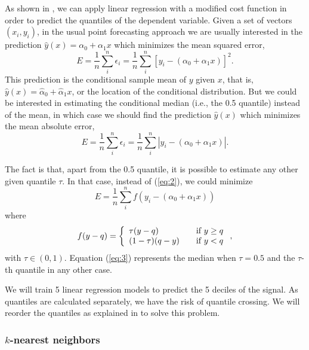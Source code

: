 \documentclass[a4paper,twocolumn,5p]{elsarticle}
\begin{document}
As shown in \cite{koenker_quantile_2001}, we can apply linear
regression with a modified cost function in order to predict the
quantiles of the dependent variable.  Given a set of vectors
$(x_i, y_i)$, in the usual point forecasting approach we are usually
interested in the prediction $\hat y(x) = \alpha_0 + \alpha_1 x$ which
minimizes the mean squared error,
\begin{equation}
  \label{eq:1}
  E = \frac{1}{n} \sum^n_i \epsilon_i =
  \frac{1}{n} \sum^n_i [ y_i - (\alpha_0 + \alpha_1 x) ]^2.
\end{equation}
This prediction is the conditional sample mean of $y$ given $x$, that
is, $\hat y(x) = \hat\alpha_0 + \hat\alpha_1 x$, or the location of
the conditional distribution. But we could be interested in estimating
the conditional median (i.e., the 0.5 quantile) instead of the mean,
in which case we should find the prediction $\hat y(x)$ which
minimizes the mean absolute error,
\begin{equation}
  \label{eq:2}
  E = \frac{1}{n} \sum^n_i \epsilon_i =
  \frac{1}{n} \sum^n_i | y_i - (\alpha_0 + \alpha_1 x) |.
\end{equation}

The fact is that, apart from the 0.5 quantile, it is possible to
estimate any other given quantile $\tau$. In that case, instead of
(\ref{eq:2}), we could minimize
\begin{equation}
  \label{eq:3}
  E= \frac{1}{n} \sum^n_i f( y_i - (\alpha_0 + \alpha_1 x))
\end{equation}
where
\begin{equation}
  \label{eq:4}
  f(y-q) = \left\{ 
    \begin{array}{l l}
      \tau (y-q) & \quad \mbox{if $y \ge q$}\\
      (1-\tau) (q-y) & \quad \mbox{if $y < q$}\\
    \end{array} \right.,
\end{equation}
with $\tau \in (0,1)$. Equation (\ref{eq:3}) represents the median
when $\tau=0.5$ and the $\tau$-th quantile in any other case.

We will train 5 linear regression models to predict the 5 deciles of
the signal. As quantiles are calculated separately, we have the risk
of quantile crossing.  We will reorder the quantiles as explained in
\cite{cross} to solve this problem.

\subsubsection{$k$-nearest neighbors}
\end{document}
